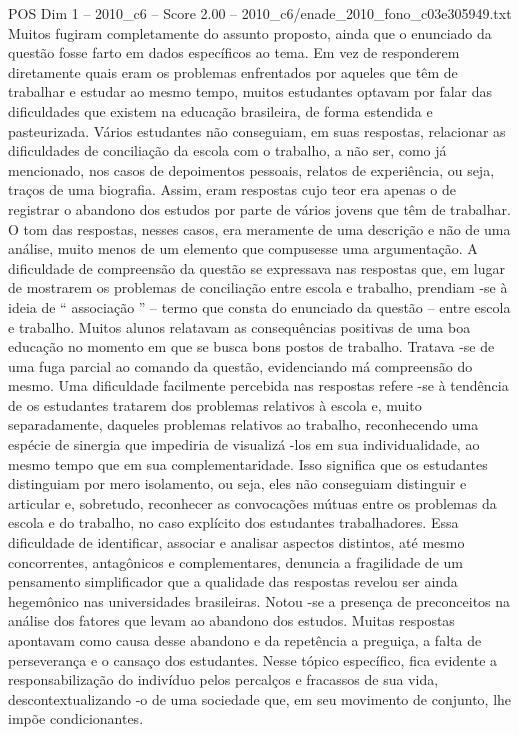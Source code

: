 \begin{textsample}{POS Dim 1 – 2010\_c6 – Score 2.00 – 2010\_c6/enade\_2010\_fono\_c03e305949.txt}
Muitos fugiram completamente do assunto proposto, ainda que o enunciado da questão fosse farto em dados específicos ao tema.
Em vez de responderem diretamente quais eram os problemas enfrentados por aqueles que têm de trabalhar e estudar ao mesmo tempo, muitos estudantes optavam por falar das dificuldades que existem na educação brasileira, de forma estendida e pasteurizada.
Vários estudantes não conseguiam, em suas respostas, relacionar as dificuldades de conciliação da escola com o trabalho, a não ser, como já mencionado, nos casos de depoimentos pessoais, relatos de experiência, ou seja, traços de uma biografia.
Assim, eram respostas cujo teor era apenas o de registrar o abandono dos estudos por parte de vários jovens que têm de trabalhar.
O tom das respostas, nesses casos, era meramente de uma descrição e não de uma análise, muito menos de um elemento que compusesse uma argumentação.
A dificuldade de compreensão da questão se expressava nas respostas que, em lugar de mostrarem os problemas de conciliação entre escola e trabalho, prendiam -se à ideia de “ associação ” – termo que consta do enunciado da questão – entre escola e trabalho.
Muitos alunos relatavam as consequências positivas de uma boa educação no momento em que se busca bons postos de trabalho.
Tratava -se de uma fuga parcial ao comando da questão, evidenciando má compreensão do mesmo.
Uma dificuldade facilmente percebida nas respostas refere -se à tendência de os estudantes tratarem dos problemas relativos à escola e, muito separadamente, daqueles problemas relativos ao trabalho, reconhecendo uma espécie de sinergia que impediria de visualizá -los em sua individualidade, ao mesmo tempo que em sua complementaridade.
Isso significa que os estudantes distinguiam por mero isolamento, ou seja, eles não conseguiam distinguir e articular e, sobretudo, reconhecer as convocações mútuas entre os problemas da escola e do trabalho, no caso explícito dos estudantes trabalhadores.
Essa dificuldade de identificar, associar e analisar aspectos distintos, até mesmo concorrentes, antagônicos e complementares, denuncia a fragilidade de um pensamento simplificador que a qualidade das respostas revelou ser ainda hegemônico nas universidades brasileiras.
Notou -se a presença de preconceitos na análise dos fatores que levam ao abandono dos estudos.
Muitas respostas apontavam como causa desse abandono e da repetência a preguiça, a falta de perseverança e o cansaço dos estudantes.
Nesse tópico específico, fica evidente a responsabilização do indivíduo pelos percalços e fracassos de sua vida, descontextualizando -o de uma sociedade que, em seu movimento de conjunto, lhe impõe condicionantes.

\end{textsample}
